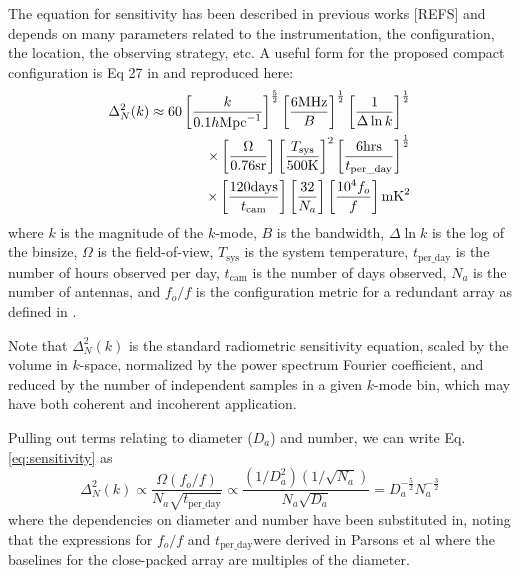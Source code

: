 \documentclass[11pt]{article}
\begin{document}
The equation for sensitivity has been described in previous works [REFS] and depends on many parameters
related to the instrumentation, the configuration, the location, the observing strategy, etc.  A useful form for 
the proposed compact configuration is Eq 27 in \citep{Parsonsetal2012} and reproduced here:
\begin{equation}
\centering
\label{eq:sensitivity}
\begin{split}
\Delta^2_N(k) \approx 60 \left[\frac{k}{0.1h\text{Mpc}^{-1}}\right]^\frac{5}{2}
                                         \left[\frac{6 \text{MHz}}{B}\right]^\frac{1}{2}
                                         \left[\frac{1}{\Delta\ln k}\right]^\frac{1}{2} \\
                        \times       \left[\frac{\Omega}{0.76\text{sr}}\right]
                                         \left[\frac{T_\text{sys}}{500 \text{K}}\right]^2
                                         \left[\frac{6 \text{hrs}}{t_\text{per\_day}}\right]^\frac{1}{2} \\
                        \times       \left[\frac{120\text{days}}{t_{\text{cam}}}\right]
                                         \left[\frac{32}{N_a}\right]
                                         \left[\frac{\text{10}^4f_o}{f}\right]  \text{mK}^2
\end{split}
\end{equation}
where $k$ is the magnitude of the $k$-mode, $B$ is the bandwidth, $\Delta\ln k$ is the log
of the binsize, $\Omega$ is the field-of-view, $T_{\text{sys}}$ is the system temperature, 
${t_\text{per\_day}}$ is the number of hours observed per day, $t_{\text{cam}}$ is the number of days
observed, $N_a$ is the number of antennas, and $f_o/f$ is the configuration metric for a 
redundant array as defined in \citep{Parsonsetal2012}.

Note that $\Delta^2_N(k)$ is the standard radiometric sensitivity equation, scaled by
the volume in $k$-space, normalized by the power spectrum Fourier coefficient, and
reduced by the number of independent samples in a given $k$-mode bin, which may have
both coherent and incoherent application.

Pulling out terms relating to diameter ($D_a$) and number, we can write Eq. \ref{eq:sensitivity} as
\begin{equation}
\label{eq:reducedSensitivity}
\Delta^2_N(k) \propto \frac{\Omega (f_o/f)}{N_a\sqrt{t_\text{per\_day}}} \propto \frac{(1/D_a^2)(1/\sqrt{N_a})}{N_a\sqrt{D_a}}
= D_a^{-\frac{5}{2}}N_a^{-\frac{3}{2}}
\end{equation}
where the dependencies on diameter and number have been substituted in, noting that the expressions for $f_o/f$ and 
$t_\text{per\_day}$were derived in Parsons et al where the baselines for the close-packed array are multiples of the diameter.
\end{document}
